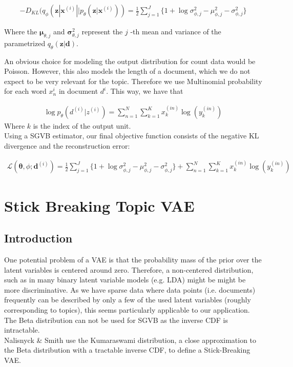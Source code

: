 \documentclass{report}
\begin{document}
	\begin{align}
	- D_{KL}(q_\phi (\mathbf{z}| \mathbf{x}^{(i)}||p_\theta (\mathbf{z}| \mathbf{x}^{(i)})) = \frac{1}{2}\sum\limits_{j=1}^{J}\{1+\log \sigma_{\phi ,j}^2 - \mu_{\phi,j}^2 - \sigma_{\phi ,j}^2\}
	\end{align}
	
	Where the $\mathbf{\mu}_{\theta,j}$ and $\mathbf{\sigma}_{\theta,j}^2$ represent the $j$ -th mean and variance of the parametrized $q_\theta(\mathbf{z}|\mathbf{d})$.
	
	An obvious choice for modeling the output distribution for count data would be Poisson. However, this also models the length of a document, which we do not expect to be very relevant for the topic. Therefore we use Multinomial probability for each word $x_n^{i}$ in document $d^{i}$. This way, we have that
	
	\begin{align}
	\log p_{\theta}(d^{(i)}|z^{(i)}) = 
	\sum_{n=1}^N
	\sum_{k=1}^K x_k^{(in)} \log (y_k^{(in)})
	\end{align}
	Where $k$ is the index of the output unit.\\
	
	
	Using a SGVB estimator, our final objective function consists of the negative KL divergence and the reconstruction error:
	
	\begin{align}
	\mathcal{L}(\mathbf{\theta}, \phi; \mathbf{d}^{(i)}) = \frac{1}{2}\sum\limits_{j=1}^{J}\{1+\log \sigma_{\phi ,j}^2 - \mu_{\phi,j}^2 - \sigma_{\phi ,j}^2\} 
	+ \sum_{n=1}^N
	\sum_{k=1}^K x_k^{(in)} \log (y_k^{(in)})
	\end{align}
	
\section{Stick Breaking Topic VAE}
\subsection{Introduction}
One potential problem of a VAE is that the probability mass of the prior over the latent variables is centered around zero. Therefore, a non-centered distribution, such as in many binary latent variable models (e.g. LDA) might be might be more discriminative. As we have sparse data where data points (i.e. documents) frequently can be described by only a few of the used latent variables (roughly corresponding to topics), this seems particularly applicable to our application.  \\
The Beta distribution can not be used for SGVB as the inverse CDF is intractable. \\
Nalisnyck \& Smith use the Kumaraswami distribution, a close approximation to the Beta distribution with a tractable inverse CDF, to define a Stick-Breaking VAE. \\
\end{document}
